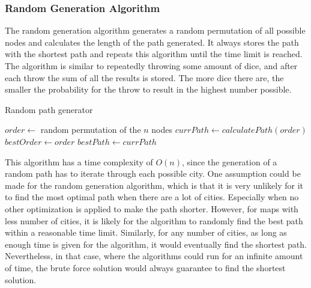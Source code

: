 \documentclass{article}
\begin{document}
\subsubsection{Random Generation Algorithm}\label{Random}
The random generation algorithm generates a random permutation of all possible nodes and calculates the length of the path generated. It always stores the path with the shortest path and repeats this algorithm until the time limit is reached. The algorithm is similar to repeatedly throwing some amount of dice, and after each throw the sum of all the results is stored. The more dice there are, the smaller the probability for the throw to result in the highest number possible.

\begin{algorithm}
\caption{Random path generator}\label{Random Algorithm}
\begin{algorithmic}

\State $order \gets $ random permutation of the $n$ nodes
\State $currPath \gets calculatePath(order)$
\State $bestOrder \gets order$
\State $bestPath \gets currPath$
\EndIf
\EndWhile

\end{algorithmic}
\end{algorithm}

\noindent
This algorithm has a time complexity of $O(n)$, since the generation of a random path has to iterate through each possible city. One assumption could be made for the random generation algorithm, which is that it is very unlikely for it to find the most optimal path when there are a lot of cities. Especially when no other optimization is applied to make the path shorter. However, for maps with less number of cities, it is likely for the algorithm to randomly find the best path within a reasonable time limit. Similarly, for any number of cities, as long as enough time is given for the algorithm, it would eventually find the shortest path. Nevertheless, in that case, where the algorithms could run for an infinite amount of time, the brute force solution would always guarantee to find the shortest solution.
\end{document}
